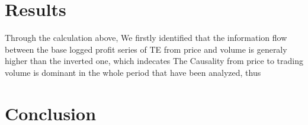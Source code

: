 \documentclass{article}
\begin{document}
\section{Results}
Through the calculation above, We firstly identified that the information flow between the base logged profit series of TE from price and volume is generaly higher than the inverted one, which indecates The Causality from price to trading volume is dominant in the whole period that have been analyzed, thus 
\section{Conclusion}
\end{document}
